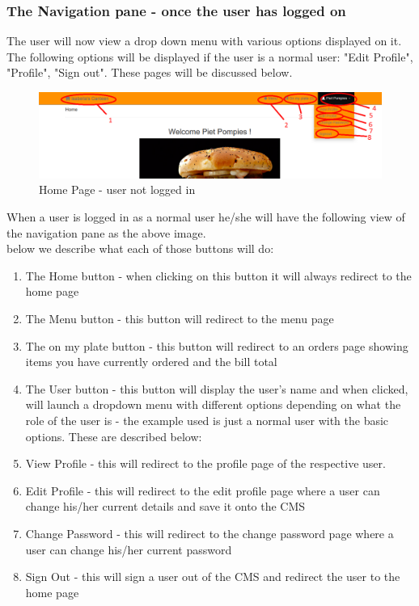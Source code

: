 \documentclass[a4paper,12pt]{report}
\begin{document}
\subsubsection{The Navigation pane - once the user has logged on}
The user will now view a drop down menu with various options displayed on it. The following options will be displayed if the user is a normal user: "Edit Profile", "Profile", "Sign out". These pages will be discussed below.

\begin{figure}[H]
  \centering
    \includegraphics[width=1.0\textwidth]{screenshots/HomePage2.PNG}
    \caption{Home Page - user not logged in } 
\end{figure}


When a user is logged in as a normal user he/she will have the following view of the navigation pane as the above image.\\ below we describe what each of those buttons will do: \\

\begin{enumerate}
\item The Home button - when clicking on this button it will always redirect to the home page
\item The Menu button - this button will redirect to the menu page
\item The on my plate button - this button will redirect to an orders page showing items you have currently ordered and the bill total
\item The User button - this button will display the user's name and when clicked, will launch a dropdown menu with different options depending on what the role of the user is - the example used is just a normal user with the basic options. These are described below:
\item View Profile - this will redirect to the profile page of the respective user.
\item Edit Profile - this will redirect to the edit profile page where a user can change his/her current details and save it onto the CMS
\item Change Password - this will redirect to the change password page where a user can change his/her current password
\item Sign Out  - this will sign a user out of the CMS and redirect the user to the home page
\end{enumerate}
\end{document}
